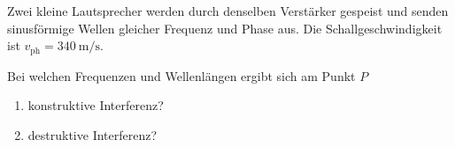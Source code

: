 \begin{ExerciseBlock}
Zwei kleine Lautsprecher werden durch denselben Verstärker gespeist und senden sinusförmige Wellen gleicher Frequenz und Phase aus. Die Schallgeschwindigkeit ist $v_\mathrm{ph}=\qty{340}{\metre\per\second}$.
\begin{center}
\end{center}
Bei welchen Frequenzen und Wellenlängen ergibt sich am Punkt $P$
\begin{enumerate}
\item konstruktive Interferenz?
\item destruktive Interferenz?
\end{enumerate}
\end{ExerciseBlock}
